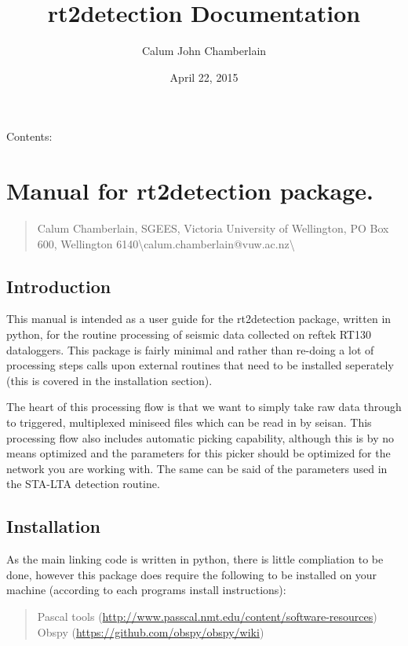 \documentclass[letterpaper,10pt,english]{sphinxmanual}
\title{rt2detection Documentation}
\date{April 22, 2015}
\author{Calum John Chamberlain}
\begin{document}
\maketitle
\tableofcontents
{}\label{index::doc}


Contents:


\chapter{Manual for rt2detection package.}
\label{intro:welcome-to-rt2detection-s-documentation}\label{intro:manual-for-rt2detection-package}\label{intro::doc}\begin{quote}

Calum Chamberlain, SGEES, Victoria University of Wellington, PO Box 600, Wellington 6140\textbackslash{}calum.chamberlain@vuw.ac.nz\textbackslash{}
\end{quote}


\section{Introduction}
\label{intro:introduction}
This manual is intended as a user guide for the rt2detection package, written in python, for
the routine processing of seismic data collected on reftek RT130 dataloggers.  This package
is fairly minimal and rather than re-doing a lot of processing steps calls upon external
routines that need to be installed seperately (this is covered in the installation section).

The heart of this processing flow is that we want to simply take raw data through to triggered,
multiplexed miniseed files which can be read in by seisan.  This processing flow also includes
automatic picking capability, although this is by no means optimized and the parameters for this
picker should be optimized for the network you are working with.  The same can be said of the
parameters used in the STA-LTA detection routine.


\section{Installation}
\label{intro:installation}
As the main linking code is written in python, there is little compliation to be done, however
this package does require the following to be installed on your machine (according to each
programs install instructions):
\begin{quote}

Pascal tools (\href{http://www.passcal.nmt.edu/content/software-resources}{http://www.passcal.nmt.edu/content/software-resources})
Obspy (\href{https://github.com/obspy/obspy/wiki}{https://github.com/obspy/obspy/wiki})
\end{quote}
\end{document}

